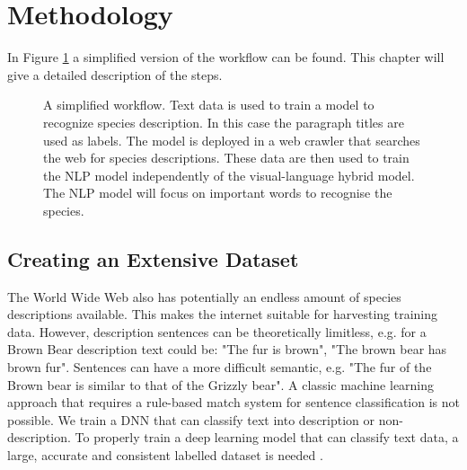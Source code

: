 \documentclass[a4paper, 12pt, oneside]{book} %
\begin{document}
\newpage
\section{Methodology}
In Figure \ref{fig:workflow} a simplified version of the workflow can be found.
This chapter will give a detailed description of the steps.

\begin{figure} [htbp]
    \centering
    \caption[Workflow]{A simplified workflow. Text data is used to train a model to recognize species description. In this case the paragraph titles are used as labels. The model is deployed in a web crawler that searches the web for species descriptions. These data are then used to train the NLP model independently of the visual-language hybrid model. The NLP model will focus on important words to recognise the species.}
    \label{fig:workflow}
\end{figure}

\subsection{Creating an Extensive Dataset}
The World Wide Web also has potentially an endless amount of species descriptions available.
This makes the internet suitable for harvesting training data.
However, description sentences can be theoretically limitless, e.g. for a Brown Bear description text could be: "The fur is brown", "The brown bear has brown fur".
Sentences can have a more difficult semantic, e.g. "The fur of the Brown bear is similar to that of the Grizzly bear".
A classic machine learning approach that requires a rule-based match system for sentence classification is not possible. 
We train a DNN that can classify text into description or non-description.
To properly train a deep learning model that can classify text data, a large, accurate and consistent labelled dataset is needed \autocite{munappy_data_2019}.
\end{document}
